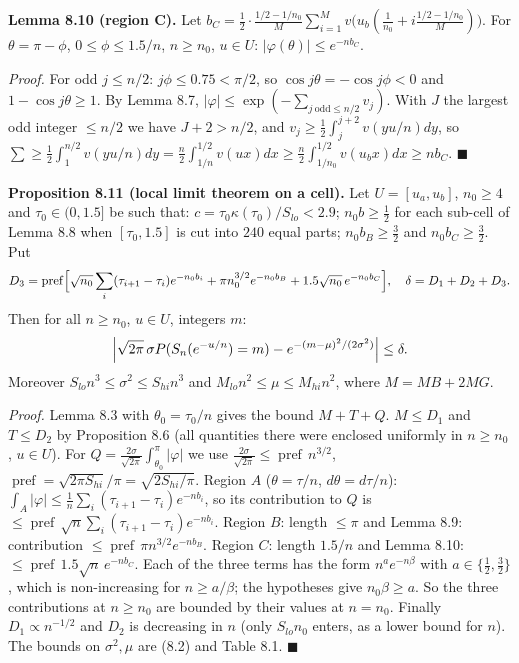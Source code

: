 \textbf{Lemma 8.10 (region C).} Let \(b_C=\frac12\cdot\frac{1/2-1/n_0}{M}\sum_{i=1}^Mv\bigl(u_b(\frac1{n_0}+i\frac{1/2-1/n_0}{M})\bigr)\). For \(\theta=\pi-\phi\), \(0\le\phi\le1.5/n\), \(n\ge n_0\), \(u\in U\): \(|\varphi(\theta)|\le e^{-nb_C}\).

\emph{Proof.} For odd \(j\le n/2\): \(j\phi\le0.75<\pi/2\), so \(\cos j\theta=-\cos j\phi<0\) and \(1-\cos j\theta\ge1\). By Lemma 8.7, \(|\varphi|\le\exp(-\sum_{j\ \mathrm{odd}\le n/2}v_j)\). With \(J\) the largest odd integer \(\le n/2\) we have \(J+2>n/2\), and \(v_j\ge\frac12\int_j^{j+2}v(yu/n)dy\), so \(\sum\ge\frac12\int_1^{n/2}v(yu/n)dy=\frac n2\int_{1/n}^{1/2}v(ux)dx\ge\frac n2\int_{1/n_0}^{1/2}v(u_bx)dx\ge nb_C\). \(\blacksquare\)

\textbf{Proposition 8.11 (local limit theorem on a cell).} Let \(U=[u_a,u_b]\), \(n_0\ge4\) and \(\tau_0\in(0,1.5]\) be such that: \(c=\tau_0\kappa(\tau_0)/S_{lo}<2.9\); \(n_0b\ge\frac12\) for each sub-cell of Lemma 8.8 when \([\tau_0,1.5]\) is cut into \(240\) equal parts; \(n_0b_B\ge\frac32\) and \(n_0b_C\ge\frac32\). Put
\[D_3=\operatorname{pref}\Bigl[\sqrt{n_0}\sum_{i}(\tau_{i+1}-\tau_i)e^{-n_0b_i}+\pi n_0^{3/2}e^{-n_0b_B}+1.5\sqrt{n_0}\,e^{-n_0b_C}\Bigr],\quad\delta=D_1+D_2+D_3.\]
Then for all \(n\ge n_0\), \(u\in U\), integers \(m\):
\[\Bigl|\sqrt{2\pi}\,\sigma P(S_n(e^{-u/n})=m)-e^{-(m-\mu)^2/(2\sigma^2)}\Bigr|\le\delta.\]
Moreover \(S_{lo}n^3\le\sigma^2\le S_{hi}n^3\) and \(M_{lo}n^2\le\mu\le M_{hi}n^2\), where \(M=MB+2MG\).

\emph{Proof.} Lemma 8.3 with \(\theta_0=\tau_0/n\) gives the bound \(M+T+Q\). \(M\le D_1\) and \(T\le D_2\) by Proposition 8.6 (all quantities there were enclosed uniformly in \(n\ge n_0\), \(u\in U\)). For \(Q=\frac{2\sigma}{\sqrt{2\pi}}\int_{\theta_0}^\pi|\varphi|\) we use \(\frac{2\sigma}{\sqrt{2\pi}}\le\operatorname{pref}\,n^{3/2}\), \(\operatorname{pref}=\sqrt{2\pi S_{hi}}/\pi=\sqrt{2S_{hi}/\pi}\). Region \(A\) (\(\theta=\tau/n\), \(d\theta=d\tau/n\)): \(\int_A|\varphi|\le\frac1n\sum_i(\tau_{i+1}-\tau_i)e^{-nb_i}\), so its contribution to \(Q\) is \(\le\operatorname{pref}\,\sqrt n\sum_i(\tau_{i+1}-\tau_i)e^{-nb_i}\). Region \(B\): length \(\le\pi\) and Lemma 8.9: contribution \(\le\operatorname{pref}\,\pi n^{3/2}e^{-nb_B}\). Region \(C\): length \(1.5/n\) and Lemma 8.10: \(\le\operatorname{pref}\,1.5\sqrt n\,e^{-nb_C}\). Each of the three terms has the form \(n^ae^{-n\beta}\) with \(a\in\{\frac12,\frac32\}\), which is non-increasing for \(n\ge a/\beta\); the hypotheses give \(n_0\beta\ge a\). So the three contributions at \(n\ge n_0\) are bounded by their values at \(n=n_0\). Finally \(D_1\propto n^{-1/2}\) and \(D_2\) is decreasing in \(n\) (only \(S_{lo}n_0\) enters, as a lower bound for \(n\)). The bounds on \(\sigma^2,\mu\) are (8.2) and Table 8.1. \(\blacksquare\)

